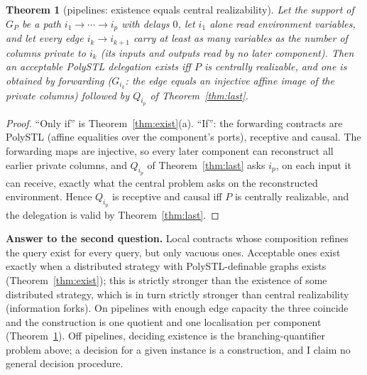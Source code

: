 \documentclass[10pt]{article}
\theoremstyle{plain}\newtheorem{theorem}{Theorem}\newtheorem{lemma}{Lemma}\newtheorem{proposition}{Proposition}\newtheorem{corollary}{Corollary}
\theoremstyle{definition}\newtheorem{definition}{Definition}
\begin{document}
\begin{theorem}[pipelines: existence equals central realizability]\label{thm:pipe}
Let the support of $G_P$ be a path $i_1\to\cdots\to i_p$ with delays $0$, let $i_1$ alone read environment variables, and let every edge $i_k\to i_{k+1}$ carry at least as many variables as the number of columns private to $i_k$ (its inputs and outputs read by no later component). Then an acceptable PolySTL delegation exists iff $P$ is centrally realizable, and one is obtained by forwarding ($G_{i_k}$: the edge equals an injective affine image of the private columns) followed by $Q_{i_p}$ of Theorem~\ref{thm:last}.
\end{theorem}
\begin{proof}
``Only if'' is Theorem~\ref{thm:exist}(a). ``If'': the forwarding contracts are PolySTL (affine equalities over the component's ports), receptive and causal. The forwarding maps are injective, so every later component can reconstruct all earlier private columns, and $Q_{i_p}$ of Theorem~\ref{thm:last} asks $i_p$, on each input it can receive, exactly what the central problem asks on the reconstructed environment. Hence $Q_{i_p}$ is receptive and causal iff $P$ is centrally realizable, and the delegation is valid by Theorem~\ref{thm:last}.
\end{proof}

\textbf{Answer to the second question.} Local contracts whose composition refines the query exist for every query, but only vacuous ones. Acceptable ones exist exactly when a distributed strategy with PolySTL-definable graphs exists (Theorem~\ref{thm:exist}); this is strictly stronger than the existence of some distributed strategy, which is in turn strictly stronger than central realizability (information forks). On pipelines with enough edge capacity the three coincide and the construction is one quotient and one localisation per component (Theorem~\ref{thm:pipe}). Off pipelines, deciding existence is the branching-quantifier problem above; a decision for a given instance is a construction, and I claim no general decision procedure.
\end{document}
